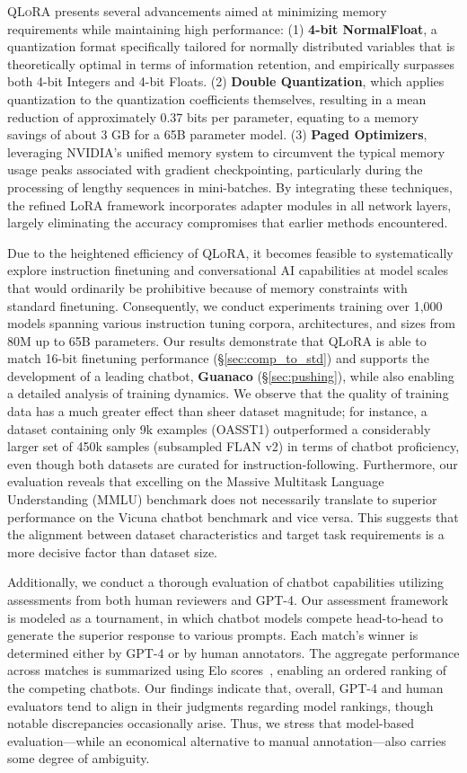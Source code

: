 \textsc{QLoRA} presents several advancements aimed at minimizing memory requirements while maintaining high performance: (1) \textbf{4-bit NormalFloat}, a quantization format specifically tailored for normally distributed variables that is theoretically optimal in terms of information retention, and empirically surpasses both 4-bit Integers and 4-bit Floats. (2) \textbf{Double Quantization}, which applies quantization to the quantization coefficients themselves, resulting in a mean reduction of approximately 0.37 bits per parameter, equating to a memory savings of about 3 GB for a 65B parameter model. (3) \textbf{Paged Optimizers}, leveraging NVIDIA’s unified memory system to circumvent the typical memory usage peaks associated with gradient checkpointing, particularly during the processing of lengthy sequences in mini-batches. By integrating these techniques, the refined LoRA framework incorporates adapter modules in all network layers, largely eliminating the accuracy compromises that earlier methods encountered.

Due to the heightened efficiency of \textsc{QLoRA}, it becomes feasible to systematically explore instruction finetuning and conversational AI capabilities at model scales that would ordinarily be prohibitive because of memory constraints with standard finetuning. Consequently, we conduct experiments training over 1,000 models spanning various instruction tuning corpora, architectures, and sizes from 80M up to 65B parameters. Our results demonstrate that \textsc{QLoRA} is able to match 16-bit finetuning performance (\S\ref{sec:comp_to_std}) and supports the development of a leading chatbot, \textbf{Guanaco} (\S\ref{sec:pushing}), while also enabling a detailed analysis of training dynamics. We observe that the quality of training data has a much greater effect than sheer dataset magnitude; for instance, a dataset containing only 9k examples (OASST1) outperformed a considerably larger set of 450k samples (subsampled FLAN v2) in terms of chatbot proficiency, even though both datasets are curated for instruction-following. Furthermore, our evaluation reveals that excelling on the Massive Multitask Language Understanding (MMLU) benchmark does not necessarily translate to superior performance on the Vicuna chatbot benchmark and vice versa. This suggests that the alignment between dataset characteristics and target task requirements is a more decisive factor than dataset size.

Additionally, we conduct a thorough evaluation of chatbot capabilities utilizing assessments from both human reviewers and GPT-4. Our assessment framework is modeled as a tournament, in which chatbot models compete head-to-head to generate the superior response to various prompts. Each match's winner is determined either by GPT-4 or by human annotators. The aggregate performance across matches is summarized using Elo scores~\citep{elo1967proposed, elo1978rating}, enabling an ordered ranking of the competing chatbots. Our findings indicate that, overall, GPT-4 and human evaluators tend to align in their judgments regarding model rankings, though notable discrepancies occasionally arise. Thus, we stress that model-based evaluation—while an economical alternative to manual annotation—also carries some degree of ambiguity.

